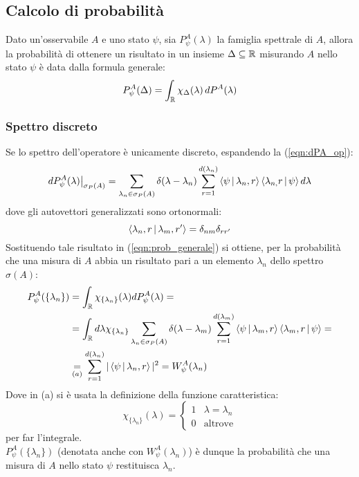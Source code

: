 \documentclass[../../FisicaTeorica.tex]{subfiles}
\begin{document}
\subsection{Calcolo di probabilità}
Dato un'osservabile $A$ e uno stato $\psi$, sia $P^A_\psi(\lambda)$ la famiglia spettrale di $A$, allora la probabilità di ottenere un risultato in un insieme $\Delta\subseteq \mathbb{R}$ misurando $A$ nello stato $\psi$ è data dalla formula generale:
\begin{equation}
P^A_\psi(\Delta) = \int_{\mathbb{R}} \chi_\Delta(\lambda)\,dP^A(\lambda)
\label{eqn:prob_generale}
\end{equation}
\subsubsection{Spettro discreto}
Se lo spettro dell'operatore è unicamente discreto, espandendo la (\ref{eqn:dPA_op}):
\[
dP^A_\psi(\lambda)\big|_{\sigma_P(A)}=\sum_{\lambda_n\in\sigma_P(A)}\delta(\lambda-\lambda_n)\sum_{r=1}^{d(\lambda_n)}\Braket{\psi|\lambda_{n},r}\Braket{\lambda_{n,}r|\psi}d\lambda
\]
dove gli autovettori generalizzati sono ortonormali:
\[
\Braket{\lambda_{n},r|\lambda_{m},r'}=\delta_{nm}\delta_{rr'}
\]
Sostituendo tale risultato in (\ref{eqn:prob_generale}) si ottiene, per la probabilità che una misura di $A$ abbia un risultato pari a un elemento $\lambda_n$ dello spettro $\sigma(A)$:
\begin{align}
P_\psi^A(\{\lambda_n\})&=\int_{\mathbb{R}} \chi_{\{\lambda_n\}}(\lambda)dP_\psi^A(\lambda)=\nonumber \\
&=
\int_{\mathbb{R}} d\lambda \chi_{\{\lambda_n\}}\sum_{\lambda_n\in\sigma_P(A)}\delta(\lambda-\lambda_m)\sum_{r=1}^{d(\lambda_m)}\Braket{\psi|\lambda_{m},r}\Braket{\lambda_{m},r|\psi} =\nonumber \\
&\underset{(a)}{=} \sum_{r=1}^{d(\lambda_n)}|\Braket{\psi|\lambda_{n},r}|^2 = W^A_\psi(\lambda_n)
\label{eqn:probability_discreta}
\end{align}
Dove in (a) si è usata la definizione della funzione caratteristica:
\[
\chi_{\{\lambda_n\}}(\lambda)=
\begin{cases}
1 & \lambda=\lambda_n\\
0 & \text{altrove}
\end{cases}
\]
per far  l'integrale.\\
$P_\psi^A(\{\lambda_n\})$ (denotata anche con $W^A_\psi (\lambda_n)$) è dunque la probabilità che una misura di $A$ nello stato $\psi$ restituisca $\lambda_n$.\\
\end{document}
